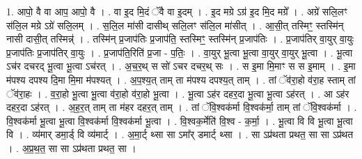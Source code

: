 \documentclass[17pt]{extarticle}
\begin{document}
1. आपो॒ वै वा आप॒ आपो॒ वै । . वा इ॒द मि॒दं ॅवै वा इ॒दम् । . इ॒द मग्रे ऽग्र॑ इ॒द मि॒द मग्रे᳚ । . अग्रे॑ सलि॒लꣳ स॑लि॒ल मग्रे ऽग्रे॑ सलि॒लम् । . स॒लि॒ल मा॑सी दासीथ् सलि॒लꣳ स॑लि॒ल मा॑सीत् । . आ॒सी॒त् तस्मिꣳ॒॒ स्तस्मि॑न् नासी दासी॒त् तस्मिन्न्॑ । . तस्मि॑न् प्र॒जाप॑तिः प्र॒जाप॑ति॒ स्तस्मिꣳ॒॒ स्तस्मि॑न् प्र॒जाप॑तिः । . प्र॒जाप॑तिर् वा॒युर् वा॒युः प्र॒जाप॑तिः प्र॒जाप॑तिर् वा॒युः । . प्र॒जाप॑ति॒रिति॑ प्र॒जा - प॒तिः॒ । . वा॒युर् भू॒त्वा भू॒त्वा वा॒युर् वा॒युर् भू॒त्वा । . भू॒त्वा ऽच॑र दचरद् भू॒त्वा भू॒त्वा ऽच॑रत् । . अ॒च॒र॒थ् स सो॑ ऽचर दचर॒थ् सः । . स इ॒मा मि॒माꣳ स स इ॒माम् । . इ॒मा म॑पश्य दपश्य दि॒मा मि॒मा म॑पश्यत् । . अ॒प॒श्य॒त् ताम् ता म॑पश्य दपश्य॒त् ताम् । . तां ॅव॑रा॒हो व॑रा॒ह स्ताम् तां ॅव॑रा॒हः । . व॒रा॒हो भू॒त्वा भू॒त्वा व॑रा॒हो व॑रा॒हो भू॒त्वा । . भू॒त्वा ऽह॑र दहर॒दा भू॒त्वा भू॒त्वा ऽह॑रत् । . आ ऽह॑र दहर॒दा ऽह॑रत् । . अ॒ह॒र॒त् ताम् ता म॑हर दहर॒त् ताम् । . तां ॅवि॒श्वक॑र्मा वि॒श्वक॑र्मा॒ ताम् तां ॅवि॒श्वक॑र्मा । . वि॒श्वक॑र्मा भू॒त्वा भू॒त्वा वि॒श्वक॑र्मा वि॒श्वक॑र्मा भू॒त्वा । . वि॒श्वक॒र्मेति॑ वि॒श्व - क॒र्मा॒ । . भू॒त्वा वि वि भू॒त्वा भू॒त्वा वि । . व्य॑मार् डमा॒र्ड् वि व्य॑मार्ट् । . अ॒मा॒र्ट् थ्सा सा ऽमा᳚र् डमार्ट् थ्सा । . सा ऽप्र॑थता प्रथत॒ सा सा ऽप्र॑थत । . अ॒प्र॒थ॒त॒ सा सा ऽप्र॑थता प्रथत॒ सा । \newline
\end{document}
